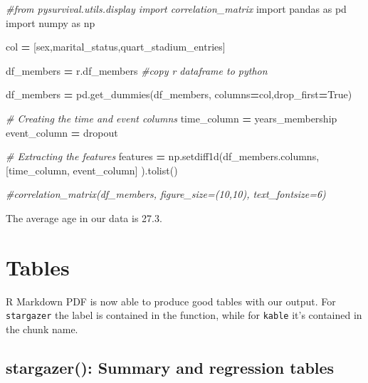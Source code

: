 \documentclass[
  12pt,
]{article}
\newenvironment{Shaded}{\begin{snugshade}}{\end{snugshade}}
\newcommand{\CommentTok}[1]{\textcolor[rgb]{0.56,0.35,0.01}{\textit{#1}}}
\newcommand{\ImportTok}[1]{#1}
\newcommand{\NormalTok}[1]{#1}
\newcommand{\OperatorTok}[1]{\textcolor[rgb]{0.81,0.36,0.00}{\textbf{#1}}}
\newcommand{\StringTok}[1]{\textcolor[rgb]{0.31,0.60,0.02}{#1}}
\newcommand{\VariableTok}[1]{\textcolor[rgb]{0.00,0.00,0.00}{#1}}
\begin{document}
\begin{Shaded}
\begin{Highlighting}[]
\CommentTok{\#from pysurvival.utils.display import correlation\_matrix}
\ImportTok{import}\NormalTok{ pandas }\ImportTok{as}\NormalTok{ pd}
\ImportTok{import}\NormalTok{ numpy }\ImportTok{as}\NormalTok{ np}

\NormalTok{col }\OperatorTok{=}\NormalTok{ [}\StringTok{\textquotesingle{}sex\textquotesingle{}}\NormalTok{,}\StringTok{\textquotesingle{}marital\_status\textquotesingle{}}\NormalTok{,}\StringTok{\textquotesingle{}quart\_stadium\_entries\textquotesingle{}}\NormalTok{]}

\NormalTok{df\_members }\OperatorTok{=}\NormalTok{ r.df\_members }\CommentTok{\#copy r dataframe to python}

\NormalTok{df\_members }\OperatorTok{=}\NormalTok{ pd.get\_dummies(df\_members, columns}\OperatorTok{=}\NormalTok{col,drop\_first}\OperatorTok{=}\VariableTok{True}\NormalTok{)}

\CommentTok{\# Creating the time and event columns}
\NormalTok{time\_column }\OperatorTok{=} \StringTok{\textquotesingle{}years\_membership\textquotesingle{}}
\NormalTok{event\_column }\OperatorTok{=} \StringTok{\textquotesingle{}dropout\textquotesingle{}}

\CommentTok{\# Extracting the features}
\NormalTok{features }\OperatorTok{=}\NormalTok{ np.setdiff1d(df\_members.columns, [time\_column, event\_column] ).tolist()}


\CommentTok{\#correlation\_matrix(df\_members, figure\_size=(10,10), text\_fontsize=6)}
\end{Highlighting}
\end{Shaded}

The average age in our data is 27.3.

\hypertarget{sec:tables}{%
\section{Tables}\label{sec:tables}}

R Markdown PDF is now able to produce good tables with our output. For
\texttt{stargazer} the label is contained in the function, while for \texttt{kable} it's
contained in the chunk name.

\hypertarget{stargazer-summary-and-regression-tables}{%
\subsection{stargazer(): Summary and regression tables}\label{stargazer-summary-and-regression-tables}}
\end{document}
